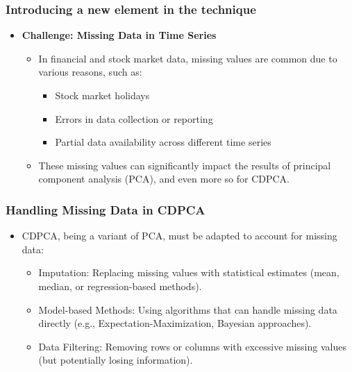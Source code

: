 \documentclass{beamer}
\begin{document}
\begin{frame}
    \frametitle{Introducing a new element in the technique}

    \begin{itemize}
        \item \textbf{Challenge: Missing Data in Time Series}
        \begin{itemize}
            \item In financial and stock market data, missing values are common due to various reasons, such as:
            \begin{itemize}
                \item Stock market holidays
                \item Errors in data collection or reporting
                \item Partial data availability across different time series
            \end{itemize}
            \item These missing values can significantly impact the results of principal component analysis (PCA), and even more so for CDPCA.
        \end{itemize}

    \end{itemize}
\end{frame}

\begin{frame}
    \frametitle{Handling Missing Data in CDPCA}

    \begin{itemize}
        \item CDPCA, being a variant of PCA, must be adapted to account for missing data:
        \begin{itemize}
            \item Imputation: Replacing missing values with statistical estimates (mean, median, or regression-based methods).
            \item Model-based Methods: Using algorithms that can handle missing data directly (e.g., Expectation-Maximization, Bayesian approaches).
            \item Data Filtering: Removing rows or columns with excessive missing values (but potentially losing information).
        \end{itemize}
    \end{itemize}

\end{frame}
\end{document}
